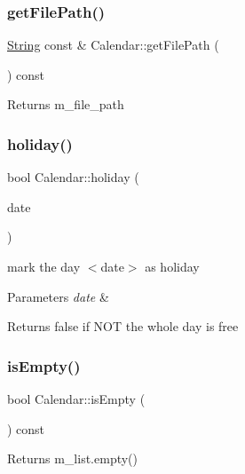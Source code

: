 \subsubsection{\texorpdfstring{get\+File\+Path()}{getFilePath()}}
{\footnotesize\ttfamily \hyperlink{classString}{String} const  \& Calendar\+::get\+File\+Path (\begin{DoxyParamCaption}{ }\end{DoxyParamCaption}) const}

\begin{DoxyReturn}{Returns}
m\+\_\+file\+\_\+path 
\end{DoxyReturn}
\mbox{\label{classCalendar_aa54f943234aebe06350ae6545804dd0a}} 
\subsubsection{\texorpdfstring{holiday()}{holiday()}}
{\footnotesize\ttfamily bool Calendar\+::holiday (\begin{DoxyParamCaption}\item[{\hyperlink{classDate}{Date} const \&}]{date }\end{DoxyParamCaption})}

mark the day $<$date$>$ as holiday 
\begin{DoxyParams}{Parameters}
{\em date} & \\
\hline
\end{DoxyParams}
\begin{DoxyReturn}{Returns}
false if N\+OT the whole day is free 
\end{DoxyReturn}
\mbox{\label{classCalendar_a304110c0454b23f75902ddcddbe8a921}} 
\subsubsection{\texorpdfstring{is\+Empty()}{isEmpty()}}
{\footnotesize\ttfamily bool Calendar\+::is\+Empty (\begin{DoxyParamCaption}{ }\end{DoxyParamCaption}) const}

\begin{DoxyReturn}{Returns}
m\+\_\+list.\+empty() 
\end{DoxyReturn}
\mbox{\label{classCalendar_abd5c6a36628d47bae770f807254fb639}} 
